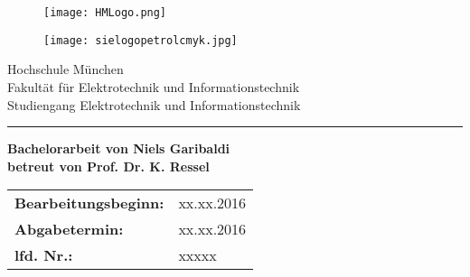 \begin{titlepage}
	\begin{figure}[h]
		
		\begin{minipage}{0.45\linewidth} 
			\raggedright 
			\texttt{[image: HMLogo.png]} 
		\end{minipage} 
		\begin{minipage}{0.45\linewidth} 
			\raggedleft
			\vspace*{1 cm} 
			\texttt{[image: sielogopetrolcmyk.jpg]} 
		\end{minipage} 
	\end{figure}
	\begin{center} 
		\vspace{1.5 cm} {\LARGE Hochschule München} \\ 
		\vspace{1 cm} {\LARGE Fakultät für Elektrotechnik und Informationstechnik} \\ 
		\vspace{2 cm} {\Large Studiengang Elektrotechnik und Informationstechnik} \\ 
		\vspace*{2 cm}{\Huge \bf Industrie 4.0 - Pathfinding auf einer SPS\\} 
		\vspace{1 cm}
		\hrule
		\vspace*{1 cm}{\Huge \bf Industry 4.0 - Pathfinding on a PLC\\} 
		\vspace{2 cm}
		{\bf Bachelorarbeit von Niels Garibaldi}\\
		\vspace{1 cm}
		{\bf betreut von  Prof. Dr. K. Ressel}\\
		
	\end{center}
	\vspace{1 cm}
	\begin{center}
		
		\begin{tabular}{ll}
			
			{\bf Bearbeitungsbeginn:} & xx.xx.2016\\
			{\bf Abgabetermin:} & xx.xx.2016\\
			{\bf lfd. Nr.:} & xxxxx\\
		\end{tabular}
	\end{center}
	
\end{titlepage}
\pagestyle{headings}
\clearpage
{}
{}
